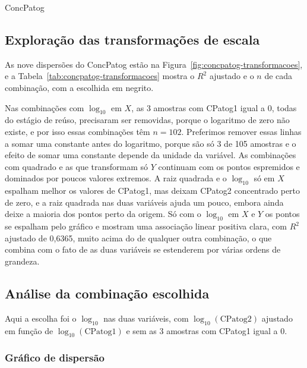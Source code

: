 \begin{dataset}{ConcPatog}
\subsection{Exploração das transformações de escala}

As nove dispersões do ConcPatog estão na Figura~\ref{fig:concpatog-transformacoes}, e a Tabela~\ref{tab:concpatog-transformacoes} mostra o $R^2$ ajustado e o $n$ de cada combinação, com a escolhida em negrito.



Nas combinações com $\log_{10}$ em $X$, as 3 amostras com CPatog1 igual a 0, todas do estágio de reúso, precisaram ser removidas, porque o logaritmo de zero não existe, e por isso essas combinações têm $n = 102$. Preferimos remover essas linhas a somar uma constante antes do logaritmo, porque são só 3 de 105 amostras e o efeito de somar uma constante depende da unidade da variável. As combinações com quadrado e as que transformam só $Y$ continuam com os pontos espremidos e dominados por poucos valores extremos. A raiz quadrada e o $\log_{10}$ só em $X$ espalham melhor os valores de CPatog1, mas deixam CPatog2 concentrado perto de zero, e a raiz quadrada nas duas variáveis ajuda um pouco, embora ainda deixe a maioria dos pontos perto da origem. Só com o $\log_{10}$ em $X$ e $Y$ os pontos se espalham pelo gráfico e mostram uma associação linear positiva clara, com $R^2$ ajustado de 0,6365, muito acima do de qualquer outra combinação, o que combina com o fato de as duas variáveis se estenderem por várias ordens de grandeza.

\subsection{Análise da combinação escolhida}

Aqui a escolha foi o $\log_{10}$ nas duas variáveis, com $\log_{10}(\text{CPatog2})$ ajustado em função de $\log_{10}(\text{CPatog1})$ e sem as 3 amostras com CPatog1 igual a 0.

\subsubsection{Gráfico de dispersão}


\end{dataset}
